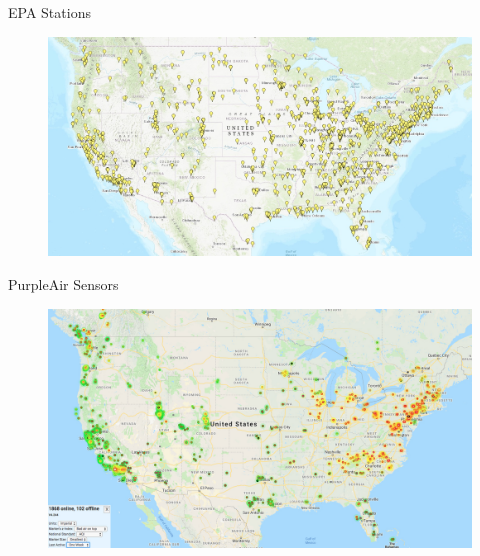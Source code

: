 \documentclass[handout]{beamer} %
\begin{document}
\begin{frame}{EPA Stations}
    \begin{figure}
        \centering
        \includegraphics[width=\textwidth]{img/appendix/Aim2/Stations/epa.jpg}
    \end{figure}
\end{frame}

\begin{frame}{PurpleAir Sensors}
    \begin{figure}
        \centering
        \includegraphics[width=\textwidth]{img/appendix/Aim2/Stations/purpleair.jpg}
    \end{figure}
\end{frame}
\end{document}
